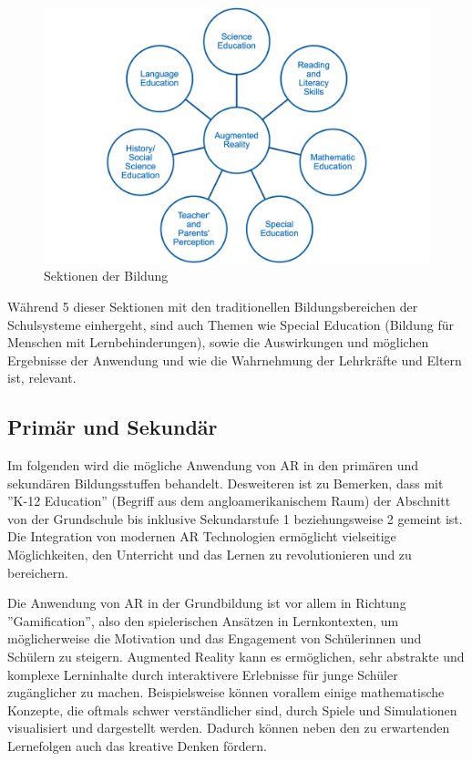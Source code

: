 \documentclass[conference]{IEEEtran}
\begin{document}
\begin{figure}[htbp]
    \centerline{\includegraphics[scale=0.3]{img/sections.png}}
    \caption{Sektionen der Bildung \cite{b4}}
    \label{fig2}
\end{figure}

Während 5 dieser Sektionen mit den traditionellen Bildungsbereichen der Schulsysteme einhergeht, sind 
auch Themen wie Special Education (Bildung für Menschen mit Lernbehinderungen), sowie die Auswirkungen
und möglichen Ergebnisse der Anwendung und wie die Wahrnehmung der Lehrkräfte und Eltern ist, relevant.

\subsection{Primär und Sekundär}
Im folgenden wird die mögliche Anwendung von AR in den primären und sekundären Bildungsstuffen behandelt.
Desweiteren ist zu Bemerken, dass mit ''K-12 Education'' (Begriff aus dem angloamerikanischem Raum) der Abschnitt
von der Grundschule bis inklusive Sekundarstufe 1 beziehungsweise 2 gemeint ist. Die Integration von modernen AR
Technologien ermöglicht vielseitige Möglichkeiten, den Unterricht und das Lernen zu revolutionieren und zu bereichern.

Die Anwendung von AR in der Grundbildung ist vor allem in Richtung ''Gamification'', 
also den spielerischen Ansätzen in Lernkontexten, um möglicherweise die Motivation und das Engagement von Schülerinnen
und Schülern zu steigern. Augmented Reality kann es ermöglichen, sehr abstrakte und komplexe Lerninhalte durch interaktivere
Erlebnisse für junge Schüler zugänglicher zu machen. Beispielsweise können vorallem einige mathematische Konzepte,
die oftmals schwer verständlicher sind, durch Spiele und Simulationen visualisiert und dargestellt werden. Dadurch können
neben den zu erwartenden Lernefolgen auch das kreative Denken fördern.
\end{document}
